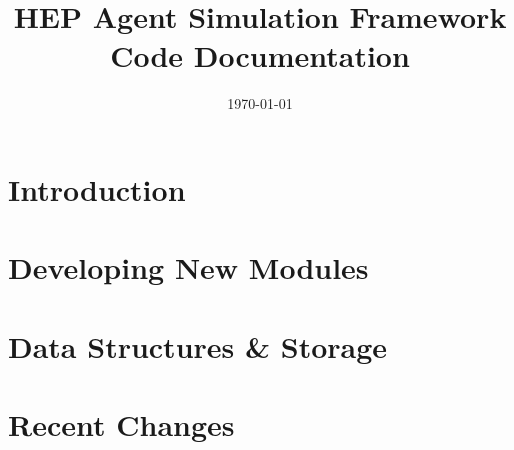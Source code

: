 \documentclass[14pt,a4paper]{extreport}
\title{\textbf{HEP Agent Simulation Framework}\\ \large Code Documentation}
\date{\today}
\begin{document}
\maketitle
\tableofcontents

\chapter{Introduction}


\chapter{Developing New Modules}


\chapter{Data Structures \& Storage}




\chapter{Recent Changes}

\end{document}
